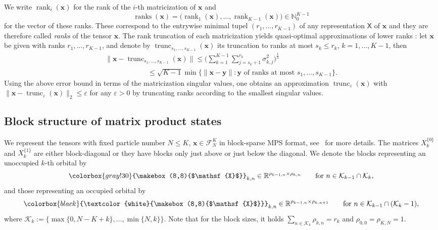 \documentclass[a4paper,11pt,oneside]{amsart}
\DeclareMathOperator{\rank}{rank}
\DeclareMathOperator{\ranks}{ranks}
\providecommand{\norm}[1]{\lVert#1\rVert}
\theoremstyle{definition}
\theoremstyle{remark}
\newcommand{\cK}{{\mathcal{K}}}
\newcommand{\cF}{{\mathcal{F}}}
\newcommand{\R}{\mathbb{R}}
\newcommand{\N}{\mathbb{N}}
\newcommand{\ten}[1]{\boldsymbol{#1}}
\newcommand{\rep}[1]{\mathsf{#1}}
\newcommand{\unocc}[1]{\colorbox{gray!30}{\makebox(8,8){$\mathsf{#1}$}}}
\newcommand{\occ}[1]{\colorbox{black}{\textcolor{white}{\makebox(8,8){$\mathsf{#1}$}}}}
\numberwithin{equation}{section}
\numberwithin{theorem}{section}
\begin{document}
We write $\rank_i(\ten x)$ for the rank of the $i$-th matricization of $\ten x$ and
\[  \ranks(\ten x) = \bigl( \rank_1(\ten x), \ldots, \rank_{K-1} (\ten x) \bigr)  \in \N_0^{K-1} \]
for the vector of these ranks. These correspond to the entrywise minimal tupel $(r_1,\ldots,r_{K-1})$ of any representation $\rep X$ of $\ten x$ and they are therefore called {\em ranks} of the tensor $\ten x$.
The rank truncation of each matricization yields quasi-optimal approximations of lower ranks \cite{Oseledets:2011:TT,Grasedyck:2010:HierarchicalSVD}: let $\ten x$ be given with ranks $r_1,\ldots,r_{K-1}$, and denote by $\operatorname{trunc}_{s_1,\ldots,s_{K-1}}(\ten x)$ its truncation to ranks at most $s_k\leq r_k$, $k=1,\ldots,K-1$, then
\begin{equation}\label{eq:ttsvdquasiopt}
\begin{multlined}
  \norm{ \ten x - \operatorname{trunc}_{s_1,\ldots,s_{K-1}}(\ten x)}
   \leq \biggl(\sum_{k=1}^{K-1} \sum_{j=s_k+1}^{r_k} \sigma_{k,j}^2 \biggr)^{\frac12} \\
  \qquad\qquad\qquad \leq \sqrt{K-1} \min\bigl\{ \norm{\ten x - \ten y} \colon \ten y \text{ of ranks at most $s_1,\ldots, s_{K-1}$} \bigr\}.
   \end{multlined}
\end{equation}
Using the above error bound in terms of the matricization singular values, one obtains an approximation $\operatorname{trunc}_\varepsilon(\ten x)$ with $\norm{\ten x - \operatorname{trunc}_\varepsilon(\ten x)}_2 \leq \varepsilon$ for any $\varepsilon>0$ by truncating ranks according to the smallest singular values.


\subsection{Block structure of matrix product states}\label{sec:blockstructure}

We represent the tensors with fixed particle number $N \leq K$, $\ten x \in \cF^K_N$ in block-sparse MPS format, see~\cite{BGP:22} for more details. The matrices $X^{\{0\}}_k$ and $X^{\{1\}}_k$ are either block-diagonal or they have blocks only just above or just below the diagonal. We denote the blocks representing an unoccupied $k$-th orbital by 
\begin{equation*}
\unocc{X}_{k,n} \in \R^{\rho_{k-1,n} \times \rho_{k,n}} \qquad \text{for $n \in \cK_{k-1}\cap \cK_{k}$},
\end{equation*}
and those representing an occupied orbital by 
\begin{equation*}
\occ{X}_{k,n}  \in \R^{\rho_{k-1,n} \times \rho_{k,n+1}} \qquad \text{for $n \in \cK_{k-1} \cap (\cK_{k}-1)$},
\end{equation*}
where $\cK_k := \bigl\{ \max\{ 0 , N - K + k \} ,\ldots,  \min\{N, k\} \bigr\}$.
Note that for the block sizes, it holds $\sum_{n \in \cK_k} \rho_{k,n} = r_k$ and $\rho_{0,0} = \rho_{K,N} = 1$.
\end{document}

